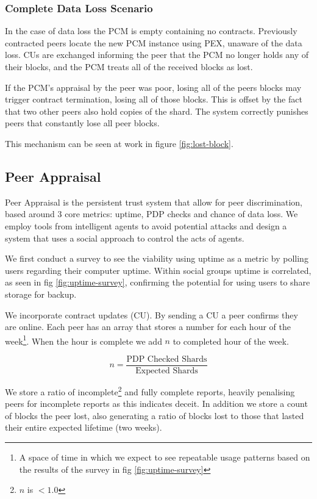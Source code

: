 \documentclass[11pt, a4paper, twocolumn, twoside]{report}
\begin{document}
\subsubsection{Complete Data Loss Scenario}

In the case of data loss the PCM is empty containing no contracts. Previously contracted peers locate the new PCM instance using PEX, unaware of the data loss. CUs are exchanged informing the peer that the PCM no longer holds any of their blocks, and the PCM treats all of the received blocks as lost.

If the PCM's appraisal by the peer was poor, losing all of the peers blocks may trigger contract termination, losing all of those blocks. This is offset by the fact that two other peers also hold copies of the shard. The system correctly punishes peers that constantly lose all peer blocks.

This mechanism can be seen at work in figure \ref{fig:lost-block}.

\subsection{Peer Appraisal} \label{sec:peerAppraisal}

Peer Appraisal is the persistent trust system that allow for peer discrimination, based around 3 core metrics: uptime, PDP checks and chance of data loss. We employ tools from intelligent agents to avoid potential attacks and design a system that uses a social approach \citep{pinyol2013computational} to control the acts of agents.

We first conduct a survey to see the viability using uptime as a metric by polling users regarding their computer uptime. Within social groups uptime is correlated, as seen in fig \ref{fig:uptime-survey}, confirming the potential for using users to share storage for backup.

We incorporate contract updates (CU). By sending a CU a peer confirms they are online. Each peer has an array that stores a number for each hour of the week\footnote{A space of time in which we expect to see repeatable usage patterns based on the results of the survey in fig \ref{fig:uptime-survey}}. When the hour is complete we add $n$ to completed hour of the week.

$$n = \frac{\mbox{PDP Checked Shards}}{\mbox{Expected Shards}}$$

We store a ratio of incomplete\footnote{$n$ is $<1.0$} and fully complete reports, heavily penalising peers for incomplete reports as this indicates deceit. In addition we store a count of blocks the peer lost, also generating a ratio of blocks lost to those that lasted their entire expected lifetime (two weeks).
\end{document}

